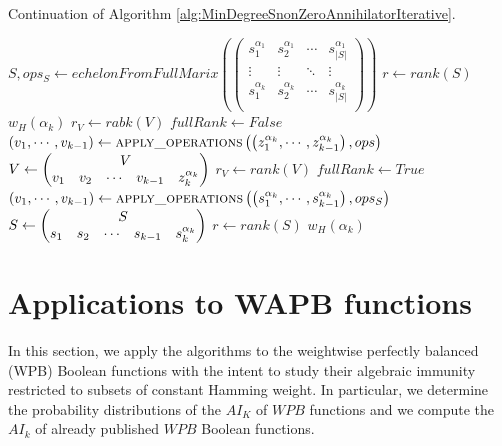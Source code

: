 \documentclass[11pt]{llncs}
\begin{document}
\newpage
\begin{algorithm}
	\caption{Continuation of Algorithm \ref{alg:MinDegreeSnonZeroAnnihilatorIterative}.}\label{alg:continueationMinDegreeSnonZeroAnnihilatorIterative}
	\begin{algorithmic}
		\State $S, ops_S \gets echelonFromFullMarix\left(
		\begin{pmatrix}
		s_1^{\alpha_1} &  s_2^{\alpha_1} & \cdots & s_{|S|}^{\alpha_{1}}\\
		\vdots &  \vdots & \ddots & \vdots\\
		s_{1}^{\alpha_k} &  s_{2}^{\alpha_k} & \cdots & s_{|S|}^{\alpha_{k}}\\
		\end{pmatrix}\right)$
		\State $r \gets rank(S)$
		\State \Return $w_H\left(\alpha_k\right)$
		\EndIf
		\State $r_V \gets rabk(V)$
		\State $fullRank \gets False$
		\State $\left(v_1, \cdots, v_{k-1}\right) \gets \mbox{\textsc{apply\_operations}}\left(\left(z_1^{\alpha_k}, \cdots, z_{k-1}^{\alpha_k}\right), ops\right)$ 
		\State $V \gets \begin{pmatrix}
			\multicolumn{5}{c}{\multirow{1}{*}{$V$}} \\
			v_1 & v_2 & \cdots & v_{k-1} & z_{k}^{\alpha_k}
		\end{pmatrix}$
		\State $r_V \gets rank(V)$
		\State $fullRank \gets True$
		\EndIf
		\State $\left(v_1, \cdots, v_{k-1}\right) \gets \mbox{\textsc{apply\_operations}}\left(\left(s_1^{\alpha_k}, \cdots, s_{k-1}^{\alpha_k}\right), ops_S\right)$ 
		\State $S \gets \begin{pmatrix}
		\multicolumn{5}{c}{\multirow{1}{*}{$S$}} \\
		s_1 & s_2 & \cdots & s_{k-1} & s_{k}^{\alpha_k}
		\end{pmatrix}$
		\State $r \gets rank(S)$
		\State \Return $w_H\left(\alpha_k\right)$
		\EndIf
		\EndWhile
	\end{algorithmic}
\end{algorithm}

\section{Applications to WAPB functions}
In this section, we apply the algorithms to the weightwise perfectly balanced (WPB) Boolean functions with the intent to study their algebraic immunity restricted to subsets of constant Hamming weight. In particular, we determine the probability distributions of the $AI_K$ of $WPB$ functions and we compute the $AI_k$ of already published $WPB$ Boolean functions.
\end{document}
